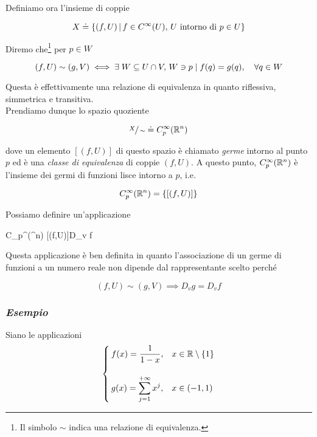 Definiamo ora l'insieme di coppie

\begin{equation}
	X \doteq \left\{ (f,U) \, \middle| \, f \in C^{\infty}(U), \, U \text{ intorno di } p \in U \right\}
\end{equation}

Diremo che\footnote{%
	Il simbolo $ \sim $ indica una relazione di equivalenza.%
} per $ p \in W $

\begin{equation}
	(f,U) \sim (g,V) \iff \E W \subseteq U \cap V, \, W \ni p \mid f(q) = g(q) \qcomma \forall q \in W
\end{equation}

Questa è effettivamente una relazione di equivalenza in quanto riflessiva, simmetrica e transitiva. \\
Prendiamo dunque lo spazio quoziente

\begin{equation}
	\sfrac{X}{\sim} \doteq C_{p}^{\infty}(\mathbb{R}^{n})
\end{equation}

dove un elemento $ [(f,U)] $ di questo spazio è chiamato \textit{germe} intorno al punto $ p $ ed è una \textit{classe di equivalenza} di coppie $ (f,U) $. A questo punto, $ C_{p}^{\infty}(\mathbb{R}^{n}) $ è l'insieme dei germi di funzioni lisce intorno a $ p $, i.e.

\begin{equation}
	C_{p}^{\infty}(\mathbb{R}^{n}) = \left\{ [(f,U)] \right\}
\end{equation} 

Possiamo definire un'applicazione

%
	{C_{p}^{\infty}(\R^{n})}{\R}%
	{[(f,U)]}{D_{v} f}

Questa applicazione è ben definita in quanto l'associazione di un germe di funzioni a un numero reale non dipende dal rappresentante scelto perché

\begin{equation}
	(f,U) \sim (g,V) \implies D_{v} g = D_{v} f
\end{equation}

\subsubsection{\textit{Esempio}}

Siano le applicazioni
\begin{equation}
	\begin{cases}
		f(x) = \dfrac{1}{1-x}, & x \in \mathbb{R} \setminus \{1\} \\ \\
		g(x) = \displaystyle\sum_{j=1}^{+\infty} x^{j}, & x \in (-1,1)
	\end{cases}
\end{equation}

